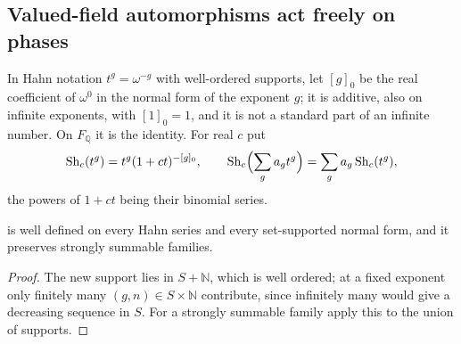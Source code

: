 \documentclass[11pt,letterpaper]{article}
\numberwithin{equation}{section}
\theoremstyle{definition}
\theoremstyle{remark}
\newcommand{\Q}{\mathbb Q}
\newcommand{\N}{\mathbb N}
\newcommand{\Sh}{\operatorname{Sh}}
\begin{document}
\subsection{Valued-field automorphisms act freely on phases}\label{trigonometry:per:sec:shifts}
In Hahn notation $t^g=\omega^{-g}$ with well-ordered supports, let $[g]_0$ be the real coefficient of
$\omega^0$ in the normal form of the exponent $g$; it is additive, also on infinite exponents, with
$[1]_0=1$, and it is not a standard part of an infinite number. On $F_{\Q}$ it is the identity. For real
$c$ put
\begin{equation}\label{trigonometry:per:eq:shift}
 \Sh_c(t^g)=t^g(1+ct)^{-[g]_0},\qquad \Sh_c\Bigl(\sum_g a_gt^g\Bigr)=\sum_g a_g\Sh_c(t^g),
\end{equation}
the powers of $1+ct$ being their binomial series.

\begin{lemma}\label{trigonometry:per:lem:shiftsupport}
 is well defined on every Hahn series and every set-supported normal
form, and it preserves strongly summable families.
\end{lemma}
\begin{proof}
The new support lies in $S+\N$, which is well ordered; at a fixed exponent only finitely many
$(g,n)\in S\times\N$ contribute, since infinitely many would give a decreasing sequence in $S$. For a
strongly summable family apply this to the union of supports.
\end{proof}
\end{document}
